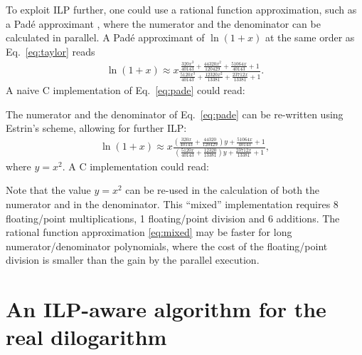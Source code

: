 \documentclass[10pt,DIV16,twocolumn,numbers=noenddot]{scrartcl}
\begin{document}
To exploit ILP further, one could use a rational function
approximation, such as a Padé approximant \cite{pade}, where the
numerator and the denominator can be calculated in parallel.  A Padé
approximant of $\ln(1+x)$ at the same order as Eq.~\eqref{eq:taylor}
reads
%
\begin{align}
  \ln(1+x) \approx x
  \frac{\frac{320 x^3}{40143}+\frac{44320 x^2}{120429}+\frac{51064
    x}{40143}+1}{\frac{5120 x^3}{40143}+\frac{12320 x^2}{13381}+\frac{23712
    x}{13381}+1}.
  \label{eq:pade}
\end{align}
%
A naive C implementation of Eq.~\eqref{eq:pade} could read:
%

%
The numerator and the denominator of Eq.~\eqref{eq:pade} can be
re-written using Estrin's scheme, allowing for further ILP:
%
\begin{align}
  \ln(1+x) \approx x
  \frac{\left(\frac{320 x}{40143}+\frac{44320}{120429}\right)y+\frac{51064
    x}{40143}+1}{\left(\frac{5120 x}{40143}+\frac{12320}{13381}\right)y+\frac{23712
    x}{13381}+1},
  \label{eq:mixed}
\end{align}
%
where $y=x^2$.  A C implementation could read:
%

%
Note that the value $y=x^2$ can be re-used in the calculation of both
the numerator and in the denominator.  This ``mixed'' implementation
requires 8 floating\-/point multiplications, 1 floating\-/point
division and 6 additions.  The rational function approximation
\eqref{eq:mixed} may be faster for long numerator/denominator
polynomials, where the cost of the floating\-/point division is
smaller than the gain by the parallel execution.


\section{An ILP-aware algorithm for the real dilogarithm}
\end{document}
